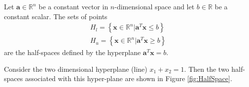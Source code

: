 \begin{definition} Let $\mathbf{a} \in \mathbb{R}^n$ be a constant vector in $n$-dimensional space and let $b \in \mathbb{R}$ be a constant scalar. The sets of points 
\begin{gather}
H_l = \left\{\mathbf{x} \in \mathbb{R}^n | \mathbf{a}^T\mathbf{x} \leq b\right\}\\
H_u = \left\{\mathbf{x} \in \mathbb{R}^n | \mathbf{a}^T\mathbf{x} \geq b\right\}
\end{gather} 
are the half-spaces defined by the hyperplane $\mathbf{a}^T\mathbf{x} = b$. 
\end{definition}
\begin{example} Consider the two dimensional hyperplane (line) $x_1 + x_2 = 1$. Then the two half-spaces associated with this hyper-plane are shown in Figure \ref{fig:HalfSpace}.
\begin{figure}[htbp]

\end{figure}
\end{example}
